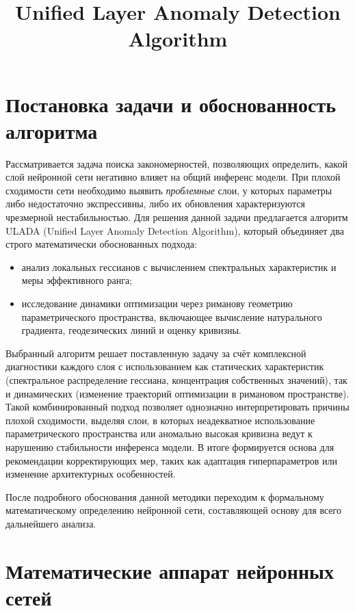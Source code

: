 \documentclass[a4paper,12pt]{article}
\title{\textbf{Unified Layer Anomaly Detection Algorithm}}
\author{ }
\date{}
\begin{document}
\maketitle

\section{Постановка задачи и обоснованность алгоритма}

Рассматривается задача поиска закономерностей, позволяющих определить, какой слой нейронной сети негативно влияет на общий инференс модели. При плохой сходимости сети необходимо выявить \emph{проблемные} слои, у которых параметры либо недостаточно экспрессивны, либо их обновления характеризуются чрезмерной нестабильностью. Для решения данной задачи предлагается алгоритм ULADA (Unified Layer Anomaly Detection Algorithm), который объединяет два строго математически обоснованных подхода:
\begin{itemize}[leftmargin=1.0cm]
\item анализ локальных гессианов с вычислением спектральных характеристик и меры эффективного ранга;
\item исследование динамики оптимизации через риманову геометрию параметрического пространства, включающее вычисление натурального градиента, геодезических линий и оценку кривизны.
\end{itemize}

Выбранный алгоритм решает поставленную задачу за счёт комплексной диагностики каждого слоя с использованием как статических характеристик (спектральное распределение гессиана, концентрация собственных значений), так и динамических (изменение траекторий оптимизации в римановом пространстве). Такой комбинированный подход позволяет однозначно интерпретировать причины плохой сходимости, выделяя слои, в которых неадекватное использование параметрического пространства или аномально высокая кривизна ведут к нарушению стабильности инференса модели. В итоге формируется основа для рекомендации корректирующих мер, таких как адаптация гиперпараметров или изменение архитектурных особенностей.

После подробного обоснования данной методики переходим к формальному математическому определению нейронной сети, составляющей основу для всего дальнейшего анализа.

\section{Математические аппарат нейронных сетей}
\end{document}
